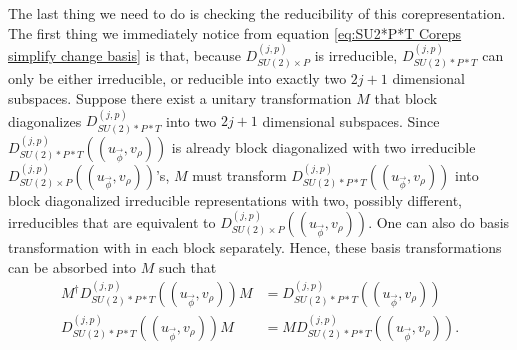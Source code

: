 \documentclass[preprint, 12pt]{revtex4-2}
\numberwithin{equation}{section}
\begin{document}
The last thing we need to do is checking the reducibility of this corepresentation. The first thing we immediately notice from equation \ref{eq:SU2*P*T Coreps simplify change basis} is that, because $D_{SU(2)\times P}^{(j,p)}$ is irreducible, $D_{SU(2)\ast P\ast T}^{(j,p)}$ can only be either irreducible, or reducible into exactly two $2j+1$ dimensional subspaces. Suppose there exist a unitary transformation $M$ that block diagonalizes $D_{SU(2)\ast P\ast T}^{(j,p)}$ into two $2j+1$ dimensional subspaces. Since $D_{SU(2)\ast P\ast T}^{(j,p)}((u_{\vec{\phi}}, v_\rho))$ is already block diagonalized with two irreducible $D_{SU(2)\times P}^{(j,p)}((u_{\vec{\phi}}, v_\rho))$'s, $M$ must transform $D_{SU(2)\ast P\ast T}^{(j,p)}((u_{\vec{\phi}}, v_\rho))$ into block diagonalized irreducible representations with two, possibly different, irreducibles that are equivalent to $D_{SU(2)\times P}^{(j,p)}((u_{\vec{\phi}}, v_\rho))$. One can also do basis transformation with in each block separately. Hence, these basis transformations can be absorbed into $M$ such that
\begin{equation}\label{eq:M block diagonalize SU2*P}
    \begin{aligned}
        M^\dagger D_{SU(2)\ast P\ast T}^{(j,p)}((u_{\vec{\phi}}, v_\rho))M &= D_{SU(2)\ast P\ast T}^{(j,p)}((u_{\vec{\phi}}, v_\rho)) \\
        D_{SU(2)\ast P\ast T}^{(j,p)}((u_{\vec{\phi}}, v_\rho))M &= MD_{SU(2)\ast P\ast T}^{(j,p)}((u_{\vec{\phi}}, v_\rho)).
    \end{aligned}
\end{equation}
\end{document}
